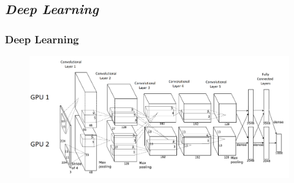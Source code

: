 \subsection[Deep Learning]{\textit{Deep Learning}}


%
%
%

\begin{frame}

	\frametitle{Deep Learning}

	\begin{figure}[!htbp]
		\centering
		\includegraphics[width=1.0\linewidth]{images/supervised/z_algorithms_deep_learning/tensor_1.png}
	\end{figure}

\end{frame}


